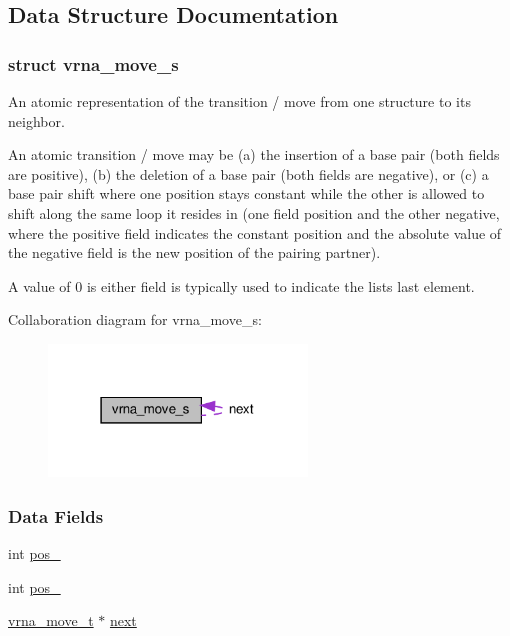 \subsection{Data Structure Documentation}
\label{structvrna__move__s}
\subsubsection{struct vrna\+\_\+move\+\_\+s}
An atomic representation of the transition / move from one structure to its neighbor. 

An atomic transition / move may be (a) the insertion of a base pair (both fields are positive), (b) the deletion of a base pair (both fields are negative), or (c) a base pair shift where one position stays constant while the other is allowed to shift along the same loop it resides in (one field position and the other negative, where the positive field indicates the constant position and the absolute value of the negative field is the new position of the pairing partner).

A value of 0 is either field is typically used to indicate the lists last element. 

Collaboration diagram for vrna\+\_\+move\+\_\+s\+:
\nopagebreak
\begin{figure}[H]
\begin{center}
\leavevmode
\includegraphics[width=195pt]{structvrna__move__s__coll__graph}
\end{center}
\end{figure}
\subsubsection*{Data Fields}
\begin{DoxyCompactItemize}
\item 
int \hyperlink{group__neighbors_a8af908c74786675a456d0f20cc8fcb9b}{pos\+\_}
\item 
int \hyperlink{group__neighbors_a3849db905a45c4e399991df38705a36b}{pos\+\_}
\item 
\hyperlink{group__neighbors_structvrna__move__s}{vrna\+\_\+move\+\_\+t} $\ast$ \hyperlink{group__neighbors_a181681bc3aab907d93e340df4777e759}{next}
\end{DoxyCompactItemize}



